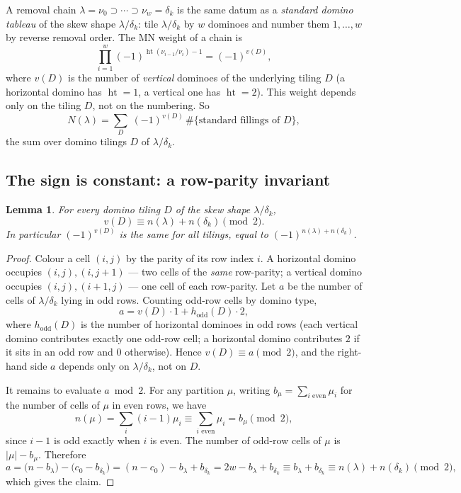 \documentclass[11pt]{article}
\newtheorem{lemma}{Lemma}
\theoremstyle{definition}
\DeclareMathOperator{\hght}{ht}
\newcommand{\la}{\lambda}
\begin{document}
A removal chain $\la=\nu_0\supset\cdots\supset\nu_w=\delta_k$ is the same datum
as a \emph{standard domino tableau} of the skew shape $\la/\delta_k$: tile
$\la/\delta_k$ by $w$ dominoes and number them $1,\dots,w$ by reverse removal
order. The MN weight of a chain is
\[
  \prod_{i=1}^w(-1)^{\hght(\nu_{i-1}/\nu_i)-1}=(-1)^{v(D)},
\]
where $v(D)$ is the number of \emph{vertical} dominoes of the underlying tiling
$D$ (a horizontal domino has $\hght=1$, a vertical one has $\hght=2$). This weight
depends only on the tiling $D$, not on the numbering. So
\begin{equation}\label{eq:Nsum}
  N(\la)=\sum_{D}\;(-1)^{v(D)}\,\#\{\text{standard fillings of }D\},
\end{equation}
the sum over domino tilings $D$ of $\la/\delta_k$.

\subsection{The sign is constant: a row-parity invariant}

\begin{lemma}\label{lem:sign}
For every domino tiling $D$ of the skew shape $\la/\delta_k$,
\[
  v(D)\equiv n(\la)+n(\delta_k)\pmod 2 .
\]
In particular $(-1)^{v(D)}$ is the same for all tilings, equal to
$(-1)^{n(\la)+n(\delta_k)}$.
\end{lemma}

\begin{proof}
Colour a cell $(i,j)$ by the parity of its row index $i$. A horizontal domino
occupies $(i,j),(i,j+1)$ --- two cells of the \emph{same} row-parity; a vertical
domino occupies $(i,j),(i+1,j)$ --- one cell of each row-parity. Let $a$ be the
number of cells of $\la/\delta_k$ lying in odd rows. Counting odd-row cells by
domino type,
\[
  a=v(D)\cdot 1+h_{\mathrm{odd}}(D)\cdot 2,
\]
where $h_{\mathrm{odd}}(D)$ is the number of horizontal dominoes in odd rows
(each vertical domino contributes exactly one odd-row cell; a horizontal domino
contributes $2$ if it sits in an odd row and $0$ otherwise). Hence
$v(D)\equiv a\pmod 2$, and the right-hand side $a$ depends only on
$\la/\delta_k$, not on $D$.

It remains to evaluate $a\bmod 2$. For any partition $\mu$, writing
$b_\mu=\sum_{i\text{ even}}\mu_i$ for the number of cells of $\mu$ in even rows,
we have
\[
  n(\mu)=\sum_i(i-1)\mu_i\equiv\sum_{i\text{ even}}\mu_i=b_\mu\pmod 2,
\]
since $i-1$ is odd exactly when $i$ is even. The number of odd-row cells of $\mu$
is $|\mu|-b_\mu$. Therefore
\[
  a=\big(n-b_\la\big)-\big(c_0-b_{\delta_k}\big)
   =(n-c_0)-b_\la+b_{\delta_k}
   =2w-b_\la+b_{\delta_k}
   \equiv b_\la+b_{\delta_k}
   \equiv n(\la)+n(\delta_k)\pmod 2,
\]
which gives the claim.
\end{proof}
\end{document}
